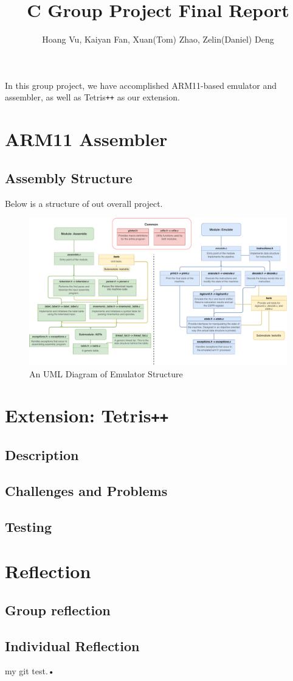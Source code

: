\documentclass[11pt]{article}
\begin{document}
\title{C Group Project Final Report}
\author{Hoang Vu, Kaiyan Fan, Xuan(Tom) Zhao, Zelin(Daniel) Deng}

\maketitle

\noindent In this group project, we have accomplished ARM11-based emulator and assembler, as well as Tetris\texttt{++} as our extension.

\section{ARM11 Assembler}
\subsection{Assembly Structure}
Below is a structure of out overall project. 
\begin{figure}[!ht]
  \centering
  \includegraphics[scale = 0.5]{project_structure_final.pdf}
  \caption{An UML Diagram of Emulator Structure}
  \label{part1:UML}
\end{figure}
\section{Extension: Tetris\texttt{++}}

\subsection{Description}

\subsection{Challenges and Problems}

\subsection{Testing}

\section{Reflection}

\subsection{Group reflection}

\subsection{Individual Reflection}

my git test.•
\end{document}
